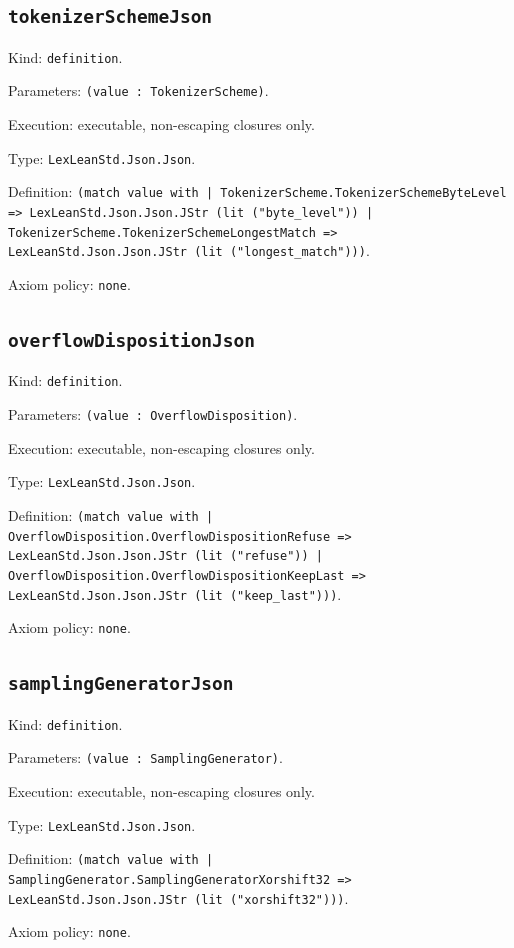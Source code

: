 \documentclass[11pt]{article}
\begin{document}
\subsection*{\texttt{tokenizerSchemeJson}}
\noindent Kind: \texttt{definition}.\par
\noindent Parameters: \texttt{(value : TokenizerScheme)}.\par
\noindent Execution: executable, non-escaping closures only.\par
\noindent Type: \texttt{LexLeanStd.Json.Json}.\par
\noindent Definition: \texttt{(match value with | TokenizerScheme.TokenizerSchemeByteLevel => LexLeanStd.Json.Json.JStr (lit ("byte\_level")) | TokenizerScheme.TokenizerSchemeLongestMatch => LexLeanStd.Json.Json.JStr (lit ("longest\_match")))}.\par
\noindent Axiom policy: \texttt{none}.\par
\subsection*{\texttt{overflowDispositionJson}}
\noindent Kind: \texttt{definition}.\par
\noindent Parameters: \texttt{(value : OverflowDisposition)}.\par
\noindent Execution: executable, non-escaping closures only.\par
\noindent Type: \texttt{LexLeanStd.Json.Json}.\par
\noindent Definition: \texttt{(match value with | OverflowDisposition.OverflowDispositionRefuse => LexLeanStd.Json.Json.JStr (lit ("refuse")) | OverflowDisposition.OverflowDispositionKeepLast => LexLeanStd.Json.Json.JStr (lit ("keep\_last")))}.\par
\noindent Axiom policy: \texttt{none}.\par
\subsection*{\texttt{samplingGeneratorJson}}
\noindent Kind: \texttt{definition}.\par
\noindent Parameters: \texttt{(value : SamplingGenerator)}.\par
\noindent Execution: executable, non-escaping closures only.\par
\noindent Type: \texttt{LexLeanStd.Json.Json}.\par
\noindent Definition: \texttt{(match value with | SamplingGenerator.SamplingGeneratorXorshift32 => LexLeanStd.Json.Json.JStr (lit ("xorshift32")))}.\par
\noindent Axiom policy: \texttt{none}.\par
\end{document}
